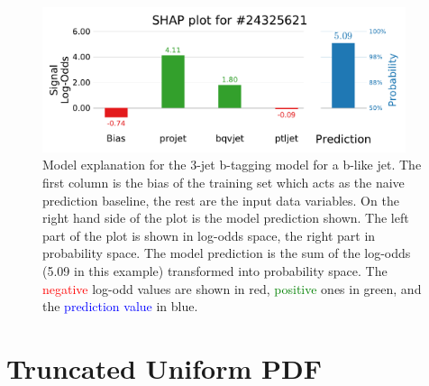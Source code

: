 \begin{figure}
  \includegraphics[width=0.95\textwidth, trim=0 0 0 40, clip]{figures/quarks/shap_values-down_sample=1.00-ML_vars=vertex-selection=b-ejet_min=4-n_iter_RS_lgb=99-n_iter_RS_xgb=9-cdot_cut=0.90-version=19-njet=3loc=24325621.pdf}
  \caption[SHAP Prediction Explanation for b-like jet]
          {Model explanation for the 3-jet b-tagging model for a b-like jet. The first column is the bias of the training set which acts as the naive prediction baseline, the rest are the input data variables. On the right hand side of the plot is the model prediction shown. The left part of the plot is shown in log-odds space, the right part in probability space. The model prediction is the sum of the log-odds (5.09 in this example) transformed into probability space. The \textcolor{red}{negative} log-odd values are shown in red, \textcolor{green}{positive} ones in green, and the \textcolor{blue}{prediction value} in blue. 
          } 
  \label{fig:q:shap_signal}
\end{figure}



\section{Truncated Uniform PDF}
\label{sec:q:trunc_uniform}

